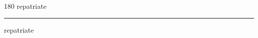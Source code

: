 
\begin{frame}
\begin{center}
\begin{turn}{180}
{\fontsize{2.5cm}{1em}\selectfont repatriate}
\end{turn}
\vspace{1em}\par  
\hrule
\vspace{1em}\par  
{\fontsize{2.5cm}{1em}\selectfont repatriate}
\end{center}
\end{frame}
